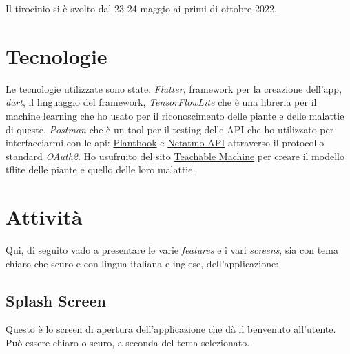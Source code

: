 \documentclass[a4paper,12pt]{report}
\begin{document}
\textsf{\small Il tirocinio si è svolto dal 23-24 maggio ai primi di ottobre 2022.}


\section{Tecnologie}

\textsf{\small Le tecnologie utilizzate sono state: \emph{Flutter}, framework per la creazione dell'app, \emph{dart}, il linguaggio del framework, \emph{TensorFlowLite} che è una libreria per il machine learning che ho usato per il riconoscimento delle piante e delle malattie di queste, \emph{Postman} che è un tool per il testing delle API che ho utilizzato per interfacciarmi con le api: \href{open.plantbook.io}{Plantbook} e \href{https://dev.netatmo.com/apidocumentation/oauth}{Netatmo API} attraverso il protocollo standard \emph{OAuth2}.} 
\textsf{\small Ho usufruito del sito \href{https://teachablemachine.withgoogle.com/}{Teachable Machine} per creare il modello tflite delle piante e quello delle loro malattie.}


\section{Attività}

\textsf{\small Qui, di seguito vado a presentare le varie \emph{features} e i vari \emph{screens}, sia con tema chiaro che scuro e con lingua italiana e inglese, dell'applicazione: }

\subsection{Splash Screen}

\textsf{\small Questo è lo screen di apertura dell'applicazione che dà il benvenuto all'utente.}
\textsf{\small Può essere chiaro o scuro, a seconda del tema selezionato.}
\end{document}
